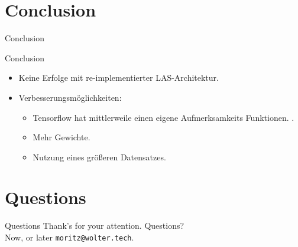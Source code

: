 \documentclass[10pt]{beamer}
\begin{document}
\section{Conclusion}
\begin{frame}{Conclusion}

\begin{table}
\caption{Ausgewählte Parameter und Fehler einiger interessanter Experimente.}
\end{table}

\end{frame}

\begin{frame}{Conclusion}
\begin{itemize}
	\item Keine Erfolge mit re-implementierter LAS-Architektur.
	\item Verbesserungsmöglichkeiten:
		\begin{itemize}
			\item Tensorflow hat mittlerweile einen eigene Aufmerksamkeits
				  Funktionen. .
			\item Mehr Gewichte.
			\item Nutzung eines größeren Datensatzes.
		\end{itemize}
\end{itemize}
\end{frame}


\section{Questions}
\begin{frame}{Questions}
	Thank's for your attention. Questions? \\
	Now, or later \texttt{moritz@wolter.tech}.
\end{frame}
\end{document}
